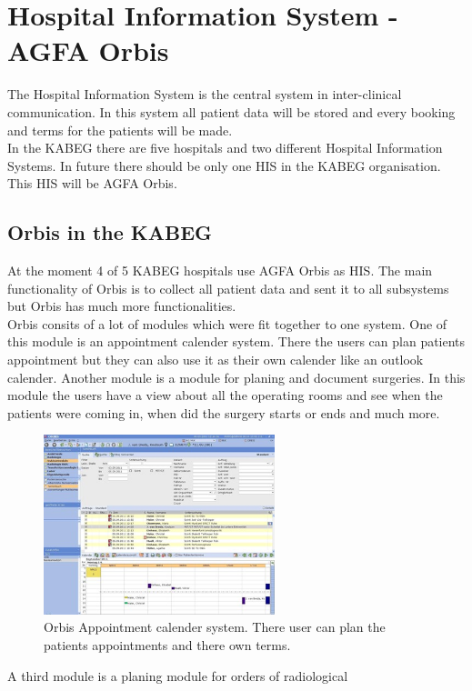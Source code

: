 \documentclass[a4paper]{article}
\begin{document}
	\newpage
	
	\section{Hospital Information System - AGFA Orbis}
	The Hospital Information System is the central system in inter-clinical
	communication. In this system all patient data will be stored and every booking
	and terms for the patients will be made.\\
	In the KABEG there are five hospitals and two different Hospital Information
	Systems. In future there should be only one HIS in the KABEG organisation. This
	HIS will be AGFA Orbis.
	\subsection{Orbis in the KABEG}
	At the moment 4 of 5 KABEG hospitals use AGFA Orbis as HIS. The main
	functionality of Orbis is to collect all patient data and sent it to all
	subsystems but Orbis has much more functionalities.\\
	Orbis consits of a lot of modules which were fit together to one system. One of
	this module is an appointment calender system. There the users can plan
	patients appointment but they can also use it as their own calender like an
	outlook calender. Another module is a module for planing and document
	surgeries. In this module the users have a view about all the operating rooms
	and see when the patients were coming in, when did the surgery starts or ends
	and much more.\\
	\begin{figure}[!ht]
		  \centering
		      \includegraphics[width=0.6\textwidth]{orbis1}
		  \caption{Orbis Appointment calender system. There user can plan the
		  patients appointments and there own terms.}
	\end{figure}
	A third module is a planing module for orders of radiological
\end{document}
